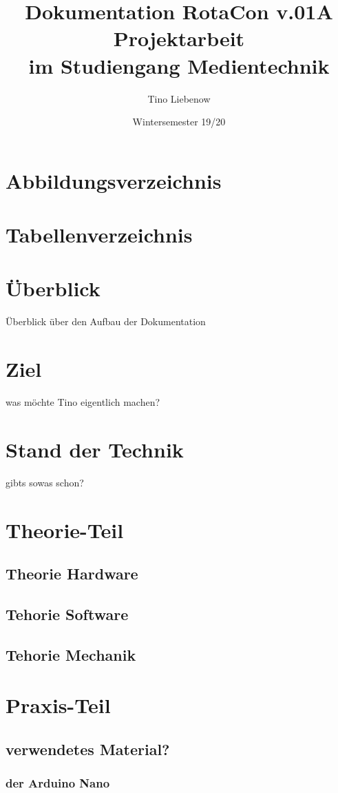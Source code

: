 \documentclass[a4paper, twoside, 10pt]{article}
\title{
	\Huge Dokumentation RotaCon v.01A
	\\
	\Large Projektarbeit
	\\
	im Studiengang Medientechnik}
\author{Tino Liebenow}
\date{Wintersemester 19/20}
\begin{document}
	\maketitle
	\newpage
	\tableofcontents
	\newpage
	\section*{Abbildungsverzeichnis}
	\newpage
	\section*{Tabellenverzeichnis}
	\newpage
	\section{Überblick}
		Überblick über den Aufbau der Dokumentation
	\section{Ziel}
		was möchte Tino eigentlich machen?
	\section{Stand der Technik}	
		gibts sowas schon?
	\section{Theorie-Teil}
		\subsection{Theorie Hardware}
		\subsection{Tehorie Software}
		\subsection{Tehorie Mechanik}
	\section{Praxis-Teil}
		\subsection{verwendetes Material?}
			\subsubsection{der Arduino Nano}
\end{document}
